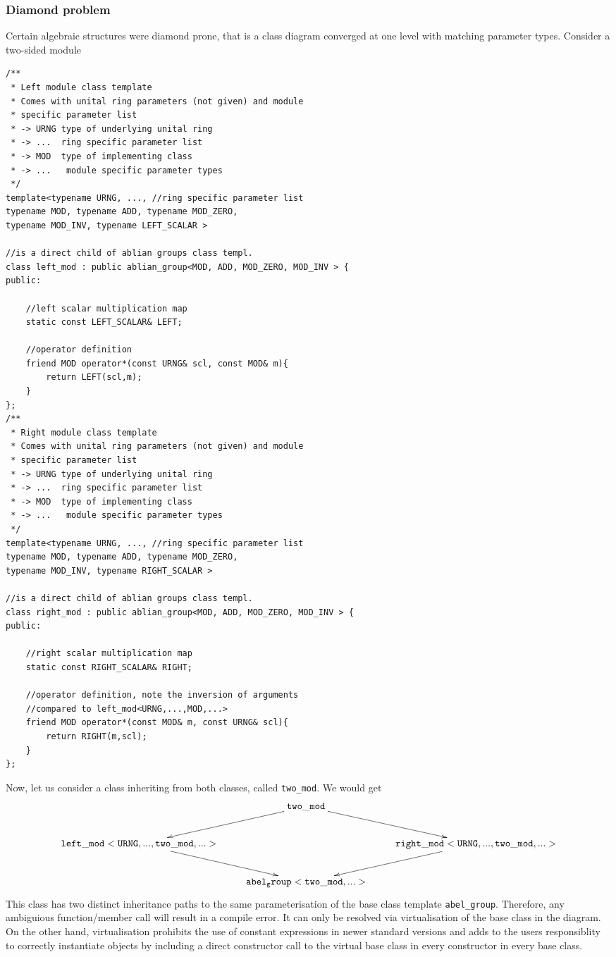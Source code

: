 \subsubsection{Diamond problem}
Certain algebraic structures were diamond prone, that is a class diagram converged at one level with matching parameter types. Consider a two-sided module
\begin{lstlisting}[frame=single]
/**
 * Left module class template
 * Comes with unital ring parameters (not given) and module
 * specific parameter list
 * -> URNG type of underlying unital ring
 * -> ...  ring specific parameter list
 * -> MOD  type of implementing class
 * -> ...	module specific parameter types
 */
template<typename URNG, ..., //ring specific parameter list
typename MOD, typename ADD, typename MOD_ZERO,
typename MOD_INV, typename LEFT_SCALAR >

//is a direct child of ablian groups class templ.
class left_mod : public ablian_group<MOD, ADD, MOD_ZERO, MOD_INV > {
public:

	//left scalar multiplication map
	static const LEFT_SCALAR& LEFT;
	
	//operator definition 
	friend MOD operator*(const URNG& scl, const MOD& m){
		return LEFT(scl,m);
	}
};
/**
 * Right module class template
 * Comes with unital ring parameters (not given) and module
 * specific parameter list
 * -> URNG type of underlying unital ring
 * -> ...  ring specific parameter list
 * -> MOD  type of implementing class
 * -> ...	module specific parameter types
 */
template<typename URNG, ..., //ring specific parameter list
typename MOD, typename ADD, typename MOD_ZERO,
typename MOD_INV, typename RIGHT_SCALAR >

//is a direct child of ablian groups class templ.
class right_mod : public ablian_group<MOD, ADD, MOD_ZERO, MOD_INV > {
public:

	//right scalar multiplication map
	static const RIGHT_SCALAR& RIGHT;
	
	//operator definition, note the inversion of arguments
	//compared to left_mod<URNG,...,MOD,...>
	friend MOD operator*(const MOD& m, const URNG& scl){
		return RIGHT(m,scl);
	}
};
\end{lstlisting} 
Now, let us consider a class inheriting from both classes, called \texttt{two\_{}mod}. We would get 
{\scriptsize
$$\xymatrix{
&\mathtt{two\_mod}\ar[rd]\ar[ld]&\\
\ar[rd]\mathtt{left\_mod<URNG,...,two\_mod,...>}&&\mathtt{right\_mod<URNG,...,two\_mod,...>}\ar[ld]\\
&\mathtt{abel_group<two\_mod,...>}&\\}$$}
This class has two distinct inheritance paths to the same parameterisation of the base class template \texttt{abel\_{}group}. Therefore, any ambiguious function/member call will result in a compile error. It can only be resolved via virtualisation of the base class in the diagram. On the other hand, virtualisation prohibits the use of constant expressions in newer standard versions and adds to the users responsiblity to correctly instantiate objects by including a direct constructor call to the virtual base class in every constructor in every base class.
